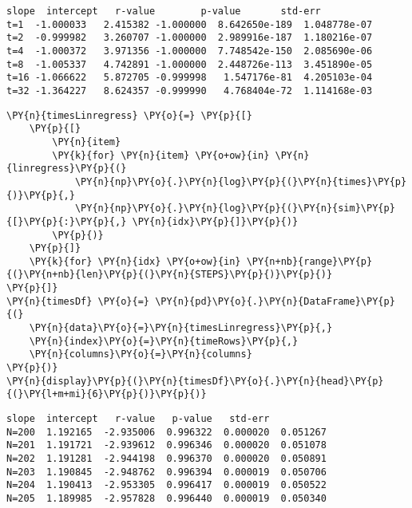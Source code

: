     
    \begin{Verbatim}[commandchars=\\\{\}]
         slope  intercept   r-value        p-value       std-err
t=1  -1.000033   2.415382 -1.000000  8.642650e-189  1.048778e-07
t=2  -0.999982   3.260707 -1.000000  2.989916e-187  1.180216e-07
t=4  -1.000372   3.971356 -1.000000  7.748542e-150  2.085690e-06
t=8  -1.005337   4.742891 -1.000000  2.448726e-113  3.451890e-05
t=16 -1.066622   5.872705 -0.999998   1.547176e-81  4.205103e-04
t=32 -1.364227   8.624357 -0.999990   4.768404e-72  1.114168e-03
    \end{Verbatim}

    
    \begin{tcolorbox}[breakable, size=fbox, boxrule=1pt, pad at break*=1mm,colback=cellbackground, colframe=cellborder]
\begin{Verbatim}[commandchars=\\\{\}]
\PY{n}{timesLinregress} \PY{o}{=} \PY{p}{[}
    \PY{p}{[}
        \PY{n}{item}
        \PY{k}{for} \PY{n}{item} \PY{o+ow}{in} \PY{n}{linregress}\PY{p}{(}
            \PY{n}{np}\PY{o}{.}\PY{n}{log}\PY{p}{(}\PY{n}{times}\PY{p}{)}\PY{p}{,}
            \PY{n}{np}\PY{o}{.}\PY{n}{log}\PY{p}{(}\PY{n}{sim}\PY{p}{[}\PY{p}{:}\PY{p}{,} \PY{n}{idx}\PY{p}{]}\PY{p}{)}
        \PY{p}{)}
    \PY{p}{]}
    \PY{k}{for} \PY{n}{idx} \PY{o+ow}{in} \PY{n+nb}{range}\PY{p}{(}\PY{n+nb}{len}\PY{p}{(}\PY{n}{STEPS}\PY{p}{)}\PY{p}{)}
\PY{p}{]}
\PY{n}{timesDf} \PY{o}{=} \PY{n}{pd}\PY{o}{.}\PY{n}{DataFrame}\PY{p}{(}
    \PY{n}{data}\PY{o}{=}\PY{n}{timesLinregress}\PY{p}{,}
    \PY{n}{index}\PY{o}{=}\PY{n}{timeRows}\PY{p}{,}
    \PY{n}{columns}\PY{o}{=}\PY{n}{columns}
\PY{p}{)}
\PY{n}{display}\PY{p}{(}\PY{n}{timesDf}\PY{o}{.}\PY{n}{head}\PY{p}{(}\PY{l+m+mi}{6}\PY{p}{)}\PY{p}{)}
\end{Verbatim}
\end{tcolorbox}

    
    \begin{Verbatim}[commandchars=\\\{\}]
          slope  intercept   r-value   p-value   std-err
N=200  1.192165  -2.935006  0.996322  0.000020  0.051267
N=201  1.191721  -2.939612  0.996346  0.000020  0.051078
N=202  1.191281  -2.944198  0.996370  0.000020  0.050891
N=203  1.190845  -2.948762  0.996394  0.000019  0.050706
N=204  1.190413  -2.953305  0.996417  0.000019  0.050522
N=205  1.189985  -2.957828  0.996440  0.000019  0.050340
    \end{Verbatim}

